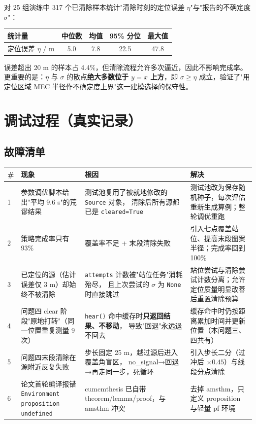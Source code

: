 对 25 组演练中 317 个已清除样本统计"清除时刻的定位误差 $\eta$"与"报告的不确定度 $\sigma$"：

\begin{center}
\begin{tabular}{lcccc}
\toprule
统计量 & 中位数 & 均值 & 95\% 分位 & 最大值 \\ \midrule
定位误差 $\eta$ / m & 5.0 & 7.8 & 22.5 & 47.8 \\
\bottomrule
\end{tabular}
\end{center}

误差超出 20 m 的样本占 4.4\%，但清除流程允许多次逼近，因此不影响完成率。
更重要的是：$\eta$ 与 $\sigma$ 的散点\textbf{绝大多数位于 $y=x$ 上方}，即
$\sigma\ge\eta$ 成立，验证了"用定位区域 MEC 半径作不确定度上界"这一建模选择的保守性。

\section{调试过程（真实记录）}

\subsection{故障清单}

\begin{longtable}{p{0.55cm}p{4.5cm}p{4.3cm}p{4.7cm}}
\toprule
\# & 现象 & 根因 & 解决 \\ \midrule
\endhead
1 & 参数调优脚本给出"平均 9.6 s"的荒谬结果 & 测试池复用了被就地修改的 \texttt{Source} 对象，
清除后所有源都已是 \texttt{cleared=True} & 测试池改为保存随机种子，每次评估重新生成算例；整轮调优重跑 \\
2 & 策略完成率只有 93\% & 覆盖率不足 $+$ 末段清除失败 & 引入七点覆盖站位、提高末段图案半径；完成率回到 100\% \\
3 & 已定位的源（估计误差仅 3 m）却始终不被清除 & \texttt{attempts} 计数被"站位任务"消耗殆尽，
且上次尝试的 $\sigma$ 为 \texttt{None} 时直接跳过 & 站位尝试与清除尝试计数分离；允许定位质量明显改善后重置清除预算 \\
4 & 问题四 clear 阶段"原地打转"（同一位置重复测量 9 次） & \texttt{hear()} 命中缓存时\textbf{只返回结果、不移动}，
导致"回退"永远退不回去 & 缓存命中时仍按距离累加时间并更新位置（本问题三、四共有） \\
5 & 问题四末段清除在源附近反复失败 & 步长固定 25 m，越过源后进入覆盖角盲区，
no\_signal→回退→再走同一步，死循环 & 引入步长二分（过冲后 $\times0.45$）与线段分点清除 \\
6 & 论文首轮编译报错 \texttt{Environment proposition undefined} & cumcmthesis 已自带 theorem/lemma/proof，与 amsthm 冲突 & 去掉 amsthm，只定义 proposition 与轻量 pf 环境 \\
\bottomrule
\end{longtable}

